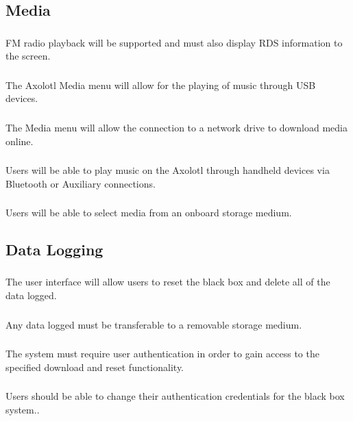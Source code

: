 \documentclass[onecolumn, draftclsnofoot,10pt, compsoc]{IEEEtran}
\begin{document}
\subsection{Media}
\subsubsection{}
FM radio playback will be supported and must also display RDS information to the screen.
\subsubsection{}
The Axolotl Media menu will allow for the playing of music through USB devices.
\subsubsection{}
The Media menu will allow the connection to a network drive to download media online.
\subsubsection{}
Users will be able to play music on the Axolotl through handheld devices via Bluetooth or Auxiliary connections.
\subsubsection{}
Users will be able to select media from an onboard storage medium. 
 
\subsection{Data Logging}
\subsubsection{}
The user interface will allow users to reset the black box and delete all of the data logged.
\subsubsection{}
Any data logged must be transferable to a removable storage medium. 
\subsubsection{}
The system must require user authentication in order to gain access to the specified download and reset functionality.
\subsubsection{}
Users should be able to change their authentication credentials for the black box system..
\end{document}
